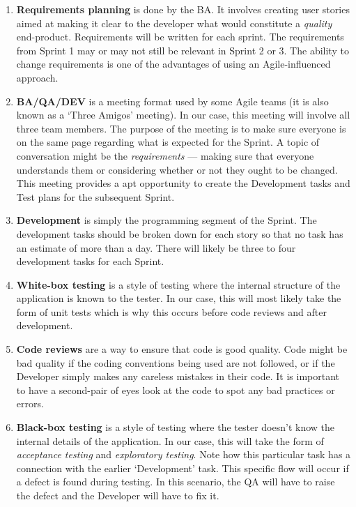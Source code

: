 \documentclass[12pt]{article}
\begin{document}
\begin{enumerate}
    \item \textbf{Requirements planning} is done by the BA. It involves creating user stories aimed at making it clear to the developer what would constitute a \emph{quality} end-product. Requirements will be written for each sprint. The requirements from Sprint 1 may or may not still be relevant in Sprint 2 or 3. The ability to change requirements is one of the advantages of using an Agile-influenced approach.
    \item \textbf{BA/QA/DEV} is a meeting format used by some Agile teams (it is also known as a `Three Amigos' meeting). In our case, this meeting will involve all three team members. The purpose of the meeting is to make sure everyone is on the same page regarding what is expected for the Sprint. A topic of conversation might be the \emph{requirements} --- making sure that everyone understands them or considering whether or not they ought to be changed. This meeting provides a apt opportunity to create the Development tasks and Test plans for the subsequent Sprint.
    \item \textbf{Development} is simply the programming segment of the Sprint. The development tasks should be broken down for each story so that no task has an estimate of more than a day. There will likely be three to four development tasks for each Sprint.
    \item \textbf{White-box testing} is a style of testing where the internal structure of the application is known to the tester. In our case, this will most likely take the form of unit tests which is why this occurs before code reviews and after development. 
    \item \textbf{Code reviews} are a way to ensure that code is good quality. Code might be bad quality if the coding conventions being used are not followed, or if the Developer simply makes any careless mistakes in their code. It is important to have a second-pair of eyes look at the code to spot any bad practices or errors.
    \item \textbf{Black-box testing} is a style of testing where the tester doesn't know the internal details of the application. In our case, this will take the form of \emph{acceptance testing} and \emph{exploratory testing}. Note how this particular task has a connection with the earlier `Development' task. This specific flow will occur if a defect is found during testing. In this scenario, the QA will have to raise the defect and the Developer will have to fix it.

\end{enumerate}
\end{document}
